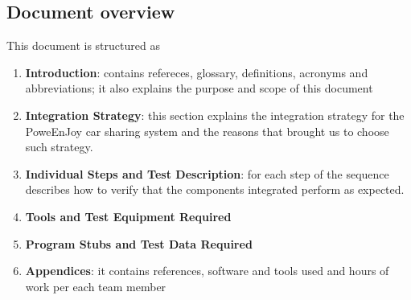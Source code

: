 \subsection{Document overview}
This document is structured as
\begin{enumerate}
	\item \textbf{Introduction}: contains refereces, glossary, definitions, acronyms and abbreviations; it also explains the purpose and scope of this document
	\item \textbf{Integration Strategy}: this section explains the integration strategy for the PoweEnJoy car sharing system and the reasons that brought us to choose such strategy.
	\item \textbf{Individual Steps and Test Description}: for each step of the sequence describes how to verify that the components integrated perform as expected.
	\item \textbf{Tools and Test Equipment Required}
	\item \textbf{Program Stubs and Test Data Required}
	\item \textbf{Appendices}: it contains references, software and tools used and hours of work per each team member
\end{enumerate}